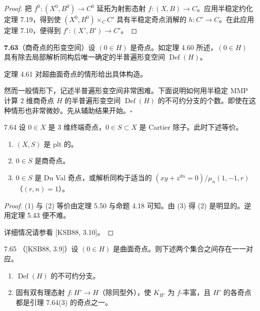 \begin{proof}
把 $f^0\colon(X^0,B^0)\to C^0$ 延拓为射影态射 $f\colon(X,B)\to C$。应用半稳定约化定理 7.19，得到使 $(X^0,B^0)\times_C C'$ 具有半稳定奇点消解的 $h\colon C'\to C$。在此应用定理 7.10，便得到 $f'\colon(X',B')\to C'$。
\end{proof}


\par\medskip\noindent\textbf{7.63}（商奇点的形变空间）\quad 设 $(0\in H)$ 是奇点。如定理 4.60 所述，$(0\in H)$ 具有除去局部解析同构后唯一确定的半普遍形变空间 $\operatorname{Def}(H)$。

定理 4.61 对超曲面奇点的情形给出具体构造。

然而一般情形下，记述半普遍形变空间非常困难。下面说明如何用半稳定 MMP 计算 2 维商奇点 $H$ 的半普遍形变空间 $\operatorname{Def}(H)$ 的不可约分支的个数。即使在这种情形也非常微妙。先从辅助结果开始。\hfill$\square$

\begin{lemmap}{7.64}
设 $0\in X$ 是 3 维终端奇点，$0\in S\subset X$ 是 Cartier 除子。此时下述等价。
\begin{enumerate}[label=(\arabic*),leftmargin=2.4em,itemsep=1pt,topsep=2pt,parsep=0pt]
\item $(X,S)$ 是 plt 的。
\item $0\in S$ 是商奇点。
\item $0\in S$ 是 Du Val 奇点，或解析同构于适当的 $(xy+z^{dn}=0)/\mu_n(1,-1,r)$（$(r,n)=1$）。
\end{enumerate}
\end{lemmap}

\begin{proof}
(1) 与 (2) 等价由定理 5.50 与命题 4.18 可知。由 (3) 得 (2) 是明显的。逆用定理 5.43 便不难。

详细情况请参看 [KSB88, 3.10]。
\end{proof}

\begin{theorem*}{7.65}
（[KSB88, 3.9]）设 $(0\in H)$ 是曲面奇点。则下述两个集合之间存在一一对应。
\begin{enumerate}[label=(\arabic*),leftmargin=2.4em,itemsep=1pt,topsep=2pt,parsep=0pt]
\item $\operatorname{Def}(H)$ 的不可约分支。
\item 固有双有理态射 $f\colon H'\to H$（除同型外），使 $K_{H'}$ 为 $f$-丰富，且 $H'$ 的各奇点都是引理 7.64(3) 的奇点之一。
\end{enumerate}
\end{theorem*}

